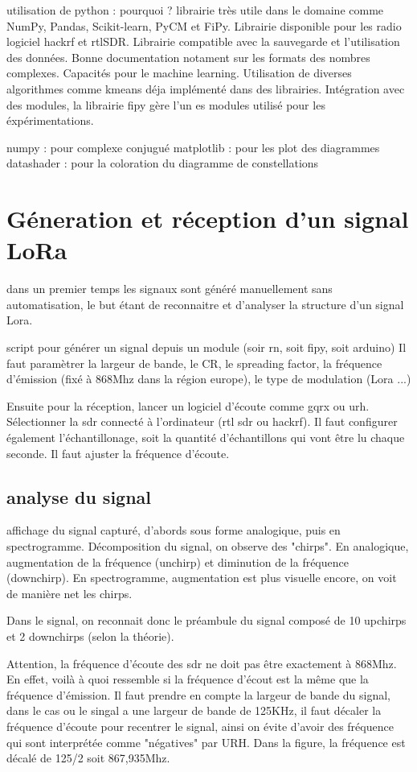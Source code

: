 utilisation de python : pourquoi ?
librairie très utile dans le domaine comme NumPy, Pandas, Scikit-learn, PyCM et FiPy.
Librairie disponible pour les radio logiciel hackrf et rtlSDR.
Librairie compatible avec la sauvegarde et l'utilisation des données. Bonne documentation notament sur les formats des nombres complexes.
Capacités pour le machine learning. Utilisation de diverses algorithmes comme kmeans déja implémenté dans des librairies.
Intégration avec des modules, la librairie fipy gère l'un es modules utilisé pour les éxpérimentations.

numpy : pour complexe conjugué
matplotlib : pour les plot des diagrammes
datashader : pour la coloration du diagramme de constellations


\section{Géneration et réception d'un signal LoRa}

dans un premier temps les signaux sont généré manuellement sans automatisation, le but étant de reconnaitre et d'analyser la structure d'un signal Lora.

script pour générer un signal depuis un module (soir rn, soit fipy, soit arduino)
Il faut paramètrer la largeur de bande, le CR, le spreading factor, la fréquence d'émission (fixé à 868Mhz dans la région europe), le type de modulation (Lora ...)

Ensuite pour la réception, lancer un logiciel d'écoute comme gqrx ou urh. Sélectionner la sdr connecté à l'ordinateur (rtl sdr ou hackrf). Il faut configurer également l'échantillonage, soit la quantité d'échantillons qui vont être lu chaque seconde. Il faut ajuster la fréquence d'écoute.

\subsection{analyse du signal}

affichage du signal capturé, d'abords sous forme analogique, puis en spectrogramme.
Décomposition du signal, on observe des "chirps". En analogique, augmentation de la fréquence (unchirp) et diminution de la fréquence (downchirp). En spectrogramme, augmentation est plus visuelle encore, on voit de manière net les chirps.

Dans le signal, on reconnait donc le préambule du signal composé de 10 upchirps et 2 downchirps (selon la théorie).

Attention, la fréquence d'écoute des sdr ne doit pas être exactement à 868Mhz. En effet, voilà à quoi ressemble si la fréquence d'écout est la même que la fréquence d'émission. Il faut prendre en compte la largeur de bande du signal, dans le cas ou le singal a une largeur de bande de 125KHz, il faut décaler la fréquence d'écoute pour recentrer le signal, ainsi on évite d'avoir des fréquence qui sont interprétée comme "négatives" par URH. Dans la figure, la fréquence est décalé de 125/2 soit 867,935Mhz.

